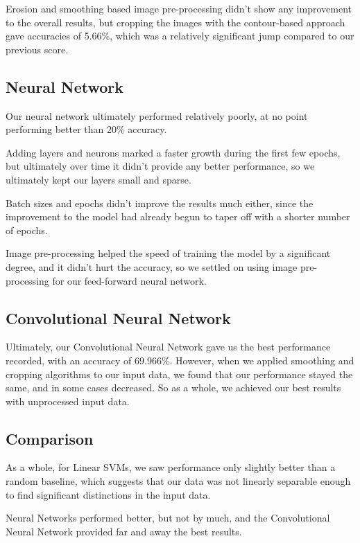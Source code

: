 \documentclass[conference]{IEEEtran}
\begin{document}
Erosion and smoothing based image pre-processing didn't show any improvement to the overall results, but cropping the images with the contour-based approach gave accuracies of 5.66\%, which was a relatively significant jump compared to our previous score.

\subsection{Neural Network}

Our neural network ultimately performed relatively poorly, at no point performing better than 20\% accuracy.

Adding layers and neurons marked a faster growth during the first few epochs, but ultimately over time it didn't provide any better performance, so we ultimately kept our layers small and sparse.

Batch sizes and epochs didn't improve the results much either, since the improvement to the model had already begun to taper off with a shorter number of epochs.

Image pre-processing helped the speed of training the model by a significant degree, and it didn't hurt the accuracy, so we settled on using image pre-processing for our feed-forward neural network.

\subsection{Convolutional Neural Network}

Ultimately, our Convolutional Neural Network gave us the best performance recorded, with an accuracy of 69.966\%. However, when we applied smoothing and cropping algorithms to our input data, we found that our performance stayed the same, and in some cases decreased. So as a whole, we achieved our best results with unprocessed input data.

\subsection{Comparison}

As a whole, for Linear SVMs, we saw performance only slightly better than a random baseline, which suggests that our data was not linearly separable enough to find significant distinctions in the input data.

Neural Networks performed better, but not by much, and the Convolutional Neural Network provided far and away the best results.
\end{document}
